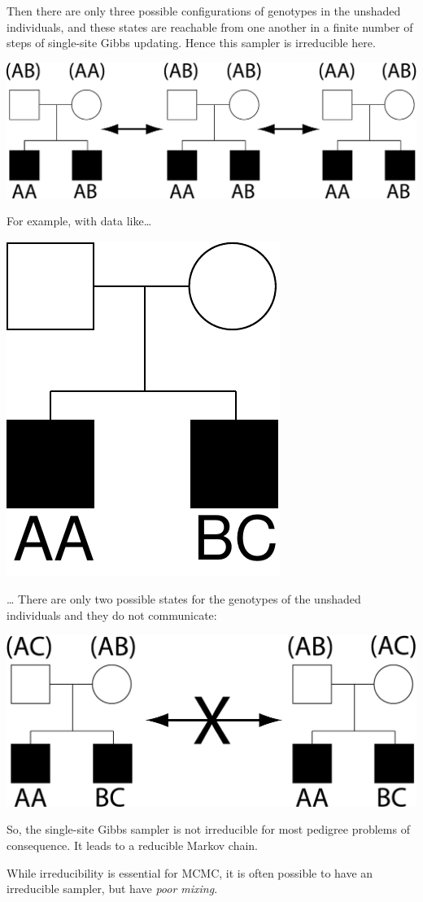 \newpage
Then there are only three possible configurations of genotypes in the unshaded individuals, and these states are reachable from one another in a finite number of steps of single-site Gibbs updating.  Hence this sampler is irreducible here.
\begin{center}
\includegraphics[width=.9\textwidth]{illus/simple_peds_comm.pdf}
\end{center}



For example, with data like\ldots
\begin{center}
\includegraphics[width=.20\textwidth]{illus/simple_ped2.pdf}
\end{center}
\newpage
\ldots
There are only two possible states for the genotypes of the unshaded individuals and they do not communicate:
\begin{center}
\includegraphics[width=.9\textwidth]{illus/simple_ped2_nocomm.pdf}
\end{center}
So, the single-site Gibbs sampler is not irreducible for most pedigree problems of consequence.  It leads to a reducible Markov chain.

While irreducibility is essential for MCMC, it is often possible to have an irreducible sampler, but have {\em poor mixing}.


